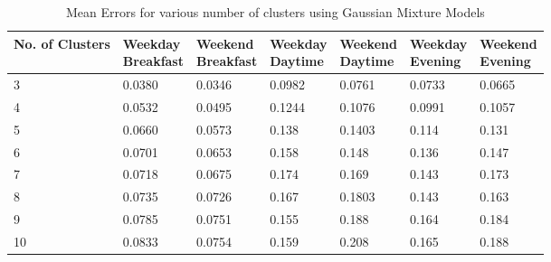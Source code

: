\documentclass[a4paper]{article}
\begin{document}
\begin{table}
\centering
\begin{tabular}{|l|l|l|l|l|l|l|}
\hline
\textbf{No. of Clusters} & \thead{\textbf{Weekday} \\ \textbf{Breakfast}} &\thead{\textbf{Weekend} \\ \textbf{ Breakfast}} &\thead{\textbf{Weekday} \\ \textbf{Daytime}} &\thead{\textbf{Weekend} \\ \textbf{Daytime}} &\thead{\textbf{Weekday} \\ \textbf{Evening}} &\thead{\textbf{Weekend} \\ \textbf{Evening}} \\
\hline
3 & 0.0380 & 0.0346 & 0.0982 & 0.0761 & 0.0733 & 0.0665 \\
\hline
4  & 0.0532 & 0.0495 & 0.1244 & 0.1076 & 0.0991 & 0.1057 \\
\hline
5 & 0.0660 & 0.0573 & 0.138 & 0.1403 & 0.114 & 0.131 \\
\hline
6 & 0.0701 & 0.0653 & 0.158 & 0.148 & 0.136 & 0.147 \\
\hline
7 & 0.0718 & 0.0675 & 0.174 & 0.169 & 0.143 & 0.173 \\
\hline
8 & 0.0735 & 0.0726 & 0.167 & 0.1803 & 0.143 & 0.163 \\
\hline
9 & 0.0785 & 0.0751 & 0.155 & 0.188 & 0.164 & 0.184 \\
\hline
10 & 0.0833 & 0.0754 & 0.159 & 0.208 & 0.165 & 0.188 \\
\hline
\end{tabular}
\caption{Mean Errors for various number of clusters using Gaussian Mixture Models}
\label{tab:cluserrs_gm}
\end{table}
\end{document}

